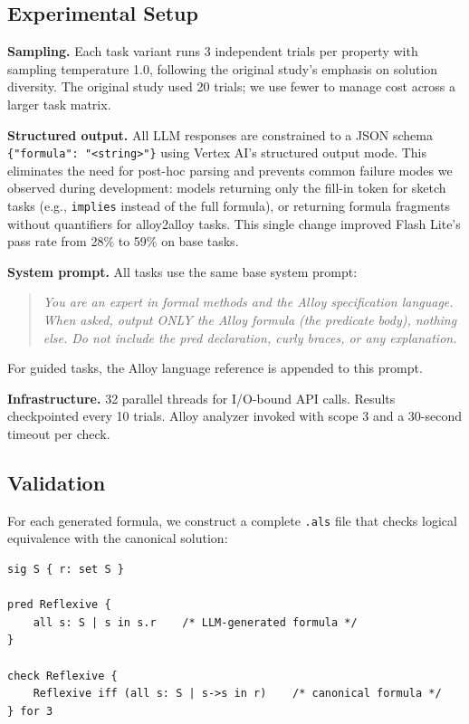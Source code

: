 \documentclass[11pt]{article}
\begin{document}
\subsection{Experimental Setup}

\textbf{Sampling.} Each task variant runs 3 independent trials per property with sampling temperature 1.0, following the original study's emphasis on solution diversity. The original study used 20 trials; we use fewer to manage cost across a larger task matrix.

\textbf{Structured output.} All LLM responses are constrained to a JSON schema \texttt{\{"formula": "<string>"\}} using Vertex AI's structured output mode. This eliminates the need for post-hoc parsing and prevents common failure modes we observed during development: models returning only the fill-in token for sketch tasks (e.g., \texttt{implies} instead of the full formula), or returning formula fragments without quantifiers for alloy2alloy tasks. This single change improved Flash Lite's pass rate from 28\% to 59\% on base tasks.

\textbf{System prompt.} All tasks use the same base system prompt:
\begin{quote}
\emph{You are an expert in formal methods and the Alloy specification language. When asked, output ONLY the Alloy formula (the predicate body), nothing else. Do not include the pred declaration, curly braces, or any explanation.}
\end{quote}
For guided tasks, the Alloy language reference is appended to this prompt.

\textbf{Infrastructure.} 32 parallel threads for I/O-bound API calls. Results checkpointed every 10 trials. Alloy analyzer invoked with scope 3 and a 30-second timeout per check.

\subsection{Validation}

For each generated formula, we construct a complete \texttt{.als} file that checks logical equivalence with the canonical solution:
\begin{verbatim}
sig S { r: set S }

pred Reflexive {
    all s: S | s in s.r    /* LLM-generated formula */
}

check Reflexive {
    Reflexive iff (all s: S | s->s in r)    /* canonical formula */
} for 3
\end{verbatim}
\end{document}
